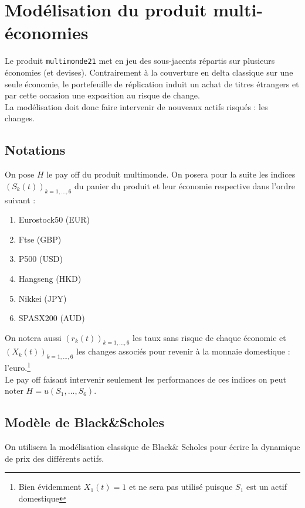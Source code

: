 \documentclass[a4paper,12pt]{article}
\begin{document}
\section{Modélisation du produit multi-économies}
Le produit {\tt multimonde21} met en jeu des sous-jacents répartis sur plusieurs économies (et devises). Contrairement à la couverture en delta classique sur une seule économie, le portefeuille de réplication induit un achat de titres étrangers et par cette occasion une exposition au risque de change. \\
La modélisation doit donc faire intervenir de nouveaux actifs risqués : les changes.
\subsection{Notations}
On pose $H$ le pay off du produit multimonde.
On posera pour la suite les indices $(S_k(t))_{k=1,\ldots,6}$ du panier du produit et leur économie respective dans l'ordre suivant : 
\begin{enumerate}
\item Eurostock50 (EUR)
\item Ftse (GBP)
\item P500 (USD)
\item Hangseng (HKD)
\item Nikkei (JPY)
\item SPASX200 (AUD)
\end{enumerate}
On notera aussi $(r_k(t))_{k=1,\ldots,6}$ les taux sans risque de chaque économie et $(X_k(t))_{k=1,\ldots,6}$ les changes associés pour revenir à la monnaie domestique : l'euro.\footnote{Bien évidemment $X_1(t)=1$ et ne sera pas utilisé puisque $S_1$ est un actif domestique} \\[2mm]
Le pay off faisant intervenir seulement les performances de ces indices on peut noter $H=u(S_1,\ldots,S_6)$.
\subsection{Modèle de Black\&Scholes}
On utilisera la modélisation classique de Black\& Scholes pour écrire la dynamique de prix des différents actifs. 
\end{document}
